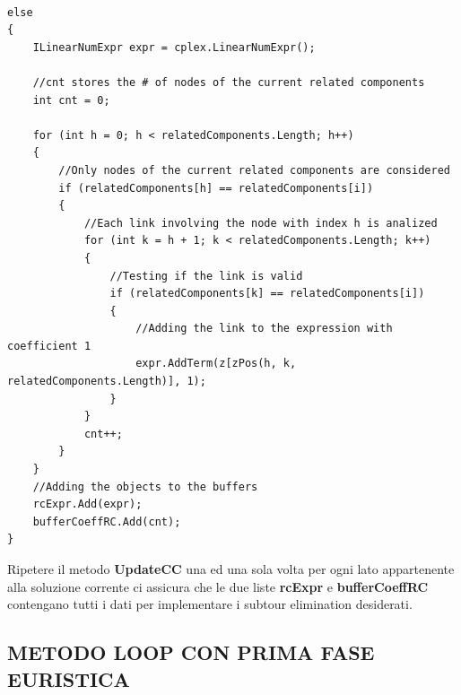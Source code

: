 \documentclass[11pt]{article}
\begin{document}
\begin{lstlisting}

else
{
    ILinearNumExpr expr = cplex.LinearNumExpr();

    //cnt stores the # of nodes of the current related components
    int cnt = 0;

    for (int h = 0; h < relatedComponents.Length; h++)
    {
        //Only nodes of the current related components are considered
        if (relatedComponents[h] == relatedComponents[i])
        {
            //Each link involving the node with index h is analized
            for (int k = h + 1; k < relatedComponents.Length; k++)
            {
                //Testing if the link is valid
                if (relatedComponents[k] == relatedComponents[i])
                {
                    //Adding the link to the expression with coefficient 1
                    expr.AddTerm(z[zPos(h, k, relatedComponents.Length)], 1);
                }
            }
            cnt++;
        }
    }
    //Adding the objects to the buffers
    rcExpr.Add(expr);
    bufferCoeffRC.Add(cnt);
}

\end{lstlisting}

Ripetere il metodo \textbf{UpdateCC} una ed una sola volta per ogni lato appartenente alla soluzione corrente ci assicura che le due liste \textbf{rcExpr} e \textbf{bufferCoeffRC} contengano tutti i dati per implementare i subtour elimination desiderati.

\subsection*{METODO LOOP CON PRIMA FASE EURISTICA}
\end{document}
